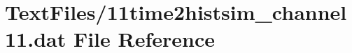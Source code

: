 \hypertarget{11time2histsim__channel11_8dat}{}\section{Text\+Files/11time2histsim\+\_\+channel11.dat File Reference}
\label{11time2histsim__channel11_8dat}
